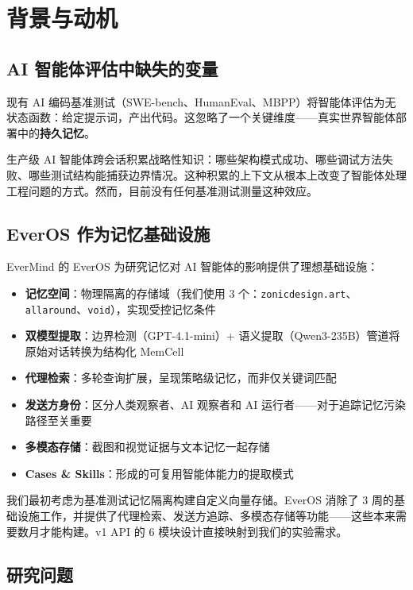 \documentclass[11pt, a4paper]{article}
\begin{document}
\section{背景与动机}

\subsection{AI 智能体评估中缺失的变量}

现有 AI 编码基准测试（SWE-bench、HumanEval、MBPP）将智能体评估为无状态函数：给定提示词，产出代码。这忽略了一个关键维度——真实世界智能体部署中的\textbf{持久记忆}。

生产级 AI 智能体跨会话积累战略性知识：哪些架构模式成功、哪些调试方法失败、哪些测试结构能捕获边界情况。这种积累的上下文从根本上改变了智能体处理工程问题的方式。然而，目前没有任何基准测试测量这种效应。

\subsection{EverOS 作为记忆基础设施}

EverMind 的 EverOS 为研究记忆对 AI 智能体的影响提供了理想基础设施：

\begin{itemize}
  \item \textbf{记忆空间}：物理隔离的存储域（我们使用 3 个：\texttt{zonicdesign.art}、\texttt{allaround}、\texttt{void}），实现受控记忆条件
  \item \textbf{双模型提取}：边界检测（GPT-4.1-mini）+ 语义提取（Qwen3-235B）管道将原始对话转换为结构化 MemCell
  \item \textbf{代理检索}：多轮查询扩展，呈现策略级记忆，而非仅关键词匹配
  \item \textbf{发送方身份}：区分人类观察者、AI 观察者和 AI 运行者——对于追踪记忆污染路径至关重要
  \item \textbf{多模态存储}：截图和视觉证据与文本记忆一起存储
  \item \textbf{Cases \& Skills}：形成的可复用智能体能力的提取模式
\end{itemize}

\begin{evidence}
我们最初考虑为基准测试记忆隔离构建自定义向量存储。EverOS 消除了 3 周的基础设施工作，并提供了代理检索、发送方追踪、多模态存储等功能——这些本来需要数月才能构建。v1 API 的 6 模块设计直接映射到我们的实验需求。
\end{evidence}

\subsection{研究问题}
\end{document}
